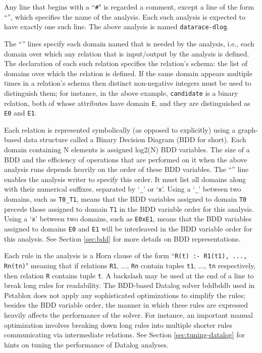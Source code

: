 Any line that begins with a ``{\tt \#}" is regarded a comment, except a
line of the form ``'', which specifies the name
 of the analysis.
Each such analysis is expected to have exactly one such line.
The above analysis is named {\tt datarace-dlog}.

The ``'' lines specify each domain named
 that is needed by the analysis, i.e., each domain over which
any relation that is input/output by the analysis is defined. 
The declaration of each such relation specifies the relation's schema:
the list of domains over which the relation is defined.
If the same domain appears multiple times in a relation's schema then
distinct non-negative integers must be used to distinguish them; for instance,
in the above example, {\tt candidate} is a binary relation, both of whose
attributes have domain {\tt E}, and they are distinguished as {\tt E0} and {\tt E1}.

Each relation is represented symbolically (as opposed to explicitly)
using a graph-based data structure called a Binary Decision Diagram (BDD for short).
Each domain containing N elements is assigned log2(N) BDD variables.
The size of a BDD and the efficiency of operations that are performed on it when the above
analysis runs depends heavily
on the order of these BDD variables.
The ``'' line enables the 
analysis writer to specify this order.
It must list all domains along with their numerical suffixes, separated
by `{\tt \_}' or `{\tt x}'.
Using a `{\tt \_}' between two domains, such as {\tt T0\_T1}, means that the BDD variables assigned
to domain {\tt T0} precede those assigned to domain {\tt T1} in the BDD variable
order for this analysis.
Using a `{\tt x}' between two domains, such as {\tt E0xE1}, means that the
BDD variables assigned to domains {\tt E0} and {\tt E1}
will be interleaved in the BDD variable order for this analysis.
See Section \ref{sec:bdd} for more details on BDD representations.

Each rule in the analysis is a Horn clause of the form
``{\tt R(t) :- R1(t1), ..., Rn(tn)}"
meaning that if relations {\tt R1}, ..., {\tt Rn} contain tuples {\tt t1}, ..., {\tt tn}
respectively, then relation {\tt R} contains tuple {\tt t}.
A backslash may be used at the end of a line to break long rules for readability.
The BDD-based Datalog solver bddbddb used in Petablox does not apply any
sophisticated optimizations to simplify the rules; besides the BDD variable order,
the manner in which these rules are expressed heavily affects the performance of
the solver.  For instance, an important manual optimization involves breaking down
long rules into multiple shorter rules communicating via intermediate relations.
See Section \ref{sec:tuning-datalog} for hints on tuning the performance
of Datalog analyses.

